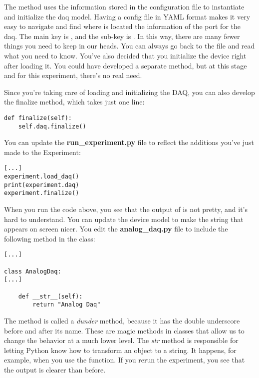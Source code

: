 The  method uses the information stored in the configuration file to instantiate and initialize the daq model. Having a config file in YAML format makes it very easy to navigate and find where is located the information of the port for the daq. The main key is , and the sub-key is . In this way, there are many fewer things you need to keep in our heads. You can always go back to the file and read what you need to know. You've also decided that you initialize the device right after loading it. You could have developed a separate method, but at this stage and for this experiment, there's no real need.

Since you're taking care of loading and initializing the DAQ, you can also develop the finalize method, which takes just one line:

\begin{verbatim}
def finalize(self):
    self.daq.finalize()
\end{verbatim}

You can update the \textbf{run\_experiment.py} file to reflect the additions you've just made to the Experiment:

\begin{verbatim}
[...]
experiment.load_daq()
print(experiment.daq)
experiment.finalize()
\end{verbatim}

When you run the code above, you see that the output of  is not pretty, and it's hard to understand. You can update the device model to make the string that appears on screen nicer. You edit the \textbf{analog\_daq.py} file to include the following method in the  class:

\begin{verbatim}
[...]

class AnalogDaq:
[...]

    def __str__(self):
        return "Analog Daq"
\end{verbatim}

The method  is called a \emph{dunder} method, because it has the double underscore before and after its name. These are magic methods in classes that allow us to change the behavior at a much lower level. The \emph{str} method is responsible for letting Python know how to transform an object to a string. It happens, for example, when you use the  function. If you rerun the experiment, you see that the output is clearer than before.

